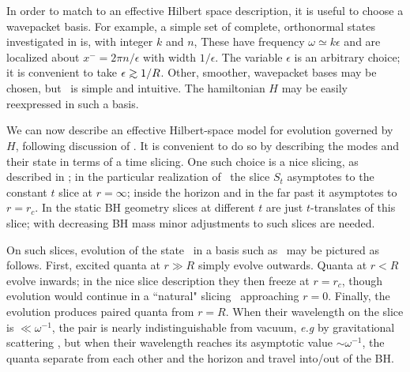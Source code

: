 In order to match to an effective Hilbert space description, it is useful to choose a wavepacket basis.  For example, a simple set of complete, orthonormal states investigated in   is, with integer $k$ and $n$, 
%
\eqn{}
%
These have frequency $\omega\simeq k\epsilon$ and are localized about $x^-=2\pi n/\epsilon$ with width $1/\epsilon$.  The variable $\epsilon$ is an arbitrary choice; it is convenient to take $\epsilon\roughly> 1/R$.  Other, smoother, wavepacket bases may be chosen, but \wavebas\ is simple and intuitive.  The hamiltonian $H$ may be easily reexpressed in such a basis.


We can now describe an effective Hilbert-space model for evolution governed by $H$, following discussion of  .  It is convenient to do so by describing the modes and their state in terms of a time slicing.  One such choice is a nice slicing, as described in  ; in the particular realization of \NLvC\ the slice $S_t$ asymptotes to the constant $t$ slice at $r=\infty$; inside the horizon and in the far past it asymptotes to $r=r_c$.  In the static BH geometry slices at different $t$ are just $t$-translates of this slice; with decreasing BH mass minor adjustments to such slices are needed.

On such slices, evolution of the state \hawkstate\ in a basis such as \wavebas\ may be pictured as follows.  First, excited quanta at $r\gg R$ simply evolve outwards.  Quanta at $r<R$ evolve inwards; in the nice slice description they then freeze at $r=r_c$, though evolution would continue in a ``natural" slicing \NLvC\ approaching $r=0$.  Finally, the evolution produces paired quanta from $r=R$.  When their wavelength on the slice is $\ll \omega^{-1}$, the pair is nearly indistinguishable from vacuum, {\it e.g} by gravitational scattering \BHIUN, but when their wavelength reaches its asymptotic value $\sim \omega^{-1}$, the quanta separate from each other and the horizon and travel into/out of the BH.  

